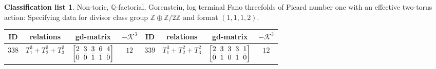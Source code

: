 \documentclass[pdftex]{sigma}%
\theoremstyle{definition}
\newtheorem{class-list}[thm]{Classification list}
\def\ZZ{{\mathbb Z}}
\def\QQ{{\mathbb Q}}
\numberwithin{equation}{section}
\begin{document}
\begin{class-list}
Non-toric, $\QQ$-factorial, Gorenstein, log terminal Fano
threefolds of Picard number one with an effective two-torus action:
Specifying data for divisor class group $\ZZ\oplus \ZZ/2\ZZ$ and format $(1,1,1,2)$.
\begin{table}[h!]\centering\setlength{\tabcolsep}{3.5pt}
\renewcommand{\arraystretch}{1.15}\small\tabulinesep=1mm
\begin{tabu}{c|c|c|c||c|c|c|c}
\hline
ID&relations&gd-matrix&$-\mathcal{K}^3$&ID&relations&gd-matrix&$-\mathcal{K}^3$
\\
\hline
${338}$&${T_{1}^{3}+T_{2}^{2}+T_{3}^{2}}$
&$\arraycolsep=1mm\begin{bmatrix}{2} & {3} & {3} & {6} & {4} \\ {\bar{0}} & {\bar{0}} & {\bar{1}} & {\bar{1}} & {\bar{0}}\end{bmatrix}$&${12}$
&${339}$&${T_{1}^{3}+T_{2}^{2}+T_{3}^{2}}$
&$\arraycolsep=1mm\begin{bmatrix}{2} & {3} & {3} & {3} & {1} \\ {\bar{0}} & {\bar{1}} & {\bar{0}} & {\bar{1}} & {\bar{0}}\end{bmatrix}$&${12}$
\\
\hline
\end{tabu}\vspace{-3mm}
\end{table}
\end{class-list}
\end{document}
